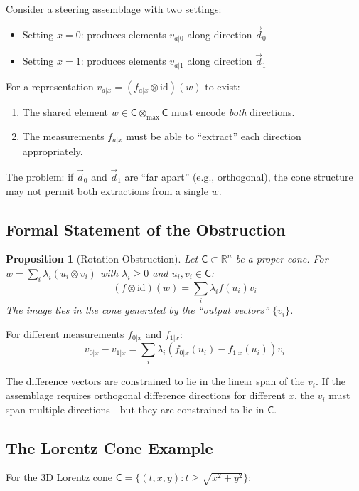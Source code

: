 \documentclass[11pt,a4paper]{article}
\newtheorem{proposition}[theorem]{Proposition}
\theoremstyle{definition}
\newcommand{\C}{\mathsf{C}}
\newcommand{\tmax}{\otimes_{\max}}
\newcommand{\R}{\mathbb{R}}
\newcommand{\id}{\mathrm{id}}
\begin{document}
Consider a steering assemblage with two settings:
\begin{itemize}
    \item Setting $x = 0$: produces elements $v_{a|0}$ along direction $\vec{d}_0$
    \item Setting $x = 1$: produces elements $v_{a|1}$ along direction $\vec{d}_1$
\end{itemize}

For a representation $v_{a|x} = (f_{a|x} \otimes \id)(w)$ to exist:

\begin{enumerate}
    \item The shared element $w \in \C \tmax \C$ must encode \emph{both} directions.
    \item The measurements $f_{a|x}$ must be able to ``extract'' each direction appropriately.
\end{enumerate}

The problem: if $\vec{d}_0$ and $\vec{d}_1$ are ``far apart'' (e.g., orthogonal), the cone structure may not permit both extractions from a single $w$.

\subsection{Formal Statement of the Obstruction}

\begin{proposition}[Rotation Obstruction]
Let $\C \subset \R^n$ be a proper cone. For $w = \sum_i \lambda_i (u_i \otimes v_i)$ with $\lambda_i \geq 0$ and $u_i, v_i \in \C$:
\[
(f \otimes \id)(w) = \sum_i \lambda_i f(u_i) v_i
\]
The image lies in the cone generated by the ``output vectors'' $\{v_i\}$.
\end{proposition}

For different measurements $f_{0|x}$ and $f_{1|x}$:
\[
v_{0|x} - v_{1|x} = \sum_i \lambda_i (f_{0|x}(u_i) - f_{1|x}(u_i)) v_i
\]

The difference vectors are constrained to lie in the linear span of the $v_i$. If the assemblage requires orthogonal difference directions for different $x$, the $v_i$ must span multiple directions---but they are constrained to lie in $\C$.

\subsection{The Lorentz Cone Example}

For the 3D Lorentz cone $\C = \{(t,x,y) : t \geq \sqrt{x^2+y^2}\}$:
\end{document}
